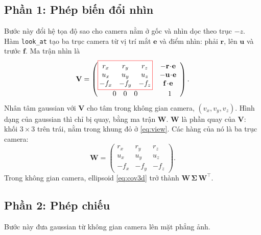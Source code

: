\documentclass[9pt,twocolumn,a4paper]{extarticle}
\newcommand{\code}[1]{\texttt{#1}}
\newcommand{\Sig}{\symbf{\Sigma}}
\begin{document}
\subsection{Phần 1: Phép biến đổi nhìn}
\label{sec:cam}
Bước này đổi hệ tọa độ sao cho camera nằm ở gốc và nhìn dọc theo trục $-z$. Hàm \code{look\_at} tạo ba trục camera từ vị trí mắt $\mathbf{e}$ và điểm nhìn: phải $\mathbf{r}$, lên $\mathbf{u}$ và trước $\mathbf{f}$. Ma trận nhìn là
\begin{equation}
\mathbf{V}=\begin{pmatrix}
\setlength{\fboxsep}{2pt}\fcolorbox{red}{white}{$\begin{matrix}
r_x&r_y&r_z\\u_x&u_y&u_z\\-f_x&-f_y&-f_z\end{matrix}$}
&\begin{matrix}-\mathbf{r}\!\cdot\!\mathbf{e}\\-\mathbf{u}\!\cdot\!\mathbf{e}\\ \mathbf{f}\!\cdot\!\mathbf{e}\end{matrix}\\[3mm]
\begin{matrix}0&0&0\end{matrix}&1\end{pmatrix}.
\label{eq:view}
\end{equation}
Nhân tâm gaussian với $\mathbf{V}$ cho tâm trong không gian camera, $(v_x,v_y,v_z)$. Hình dạng của gaussian thì chỉ bị quay, bằng ma trận $\mathbf{W}$. $\mathbf{W}$ là phần quay của $\mathbf{V}$: khối $3\times3$ trên trái, nằm trong khung đỏ ở \eqref{eq:view}. Các hàng của nó là ba trục camera:
\begin{equation}
\mathbf{W}=\begin{pmatrix}
r_x&r_y&r_z\\u_x&u_y&u_z\\-f_x&-f_y&-f_z\end{pmatrix}.
\label{eq:W}
\end{equation}
Trong không gian camera, ellipsoid \eqref{eq:cov3d} trở thành $\mathbf{W}\,\Sig\,\mathbf{W}^{\top}$.

\par\noindent{}\par\vspace{3pt}

\subsection{Phần 2: Phép chiếu}
\label{sec:ewa}
Bước này đưa gaussian từ không gian camera lên mặt phẳng ảnh.
\end{document}
